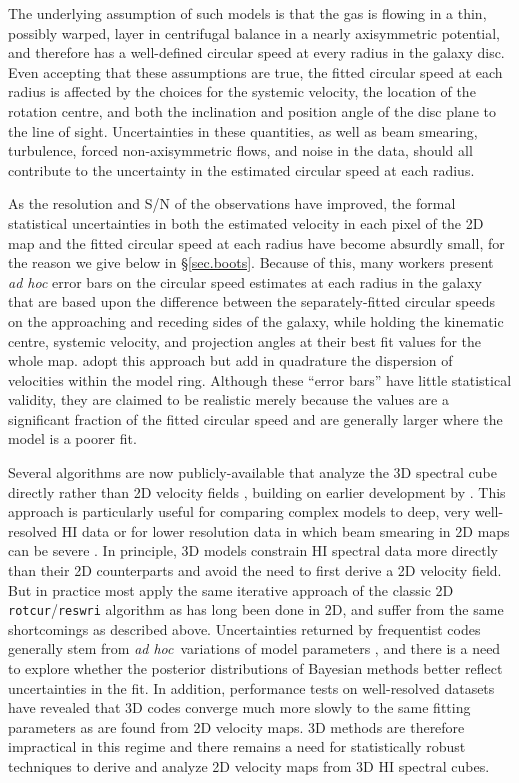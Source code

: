 \documentclass[letterpaper,fleqn,usenatbib]{mnras}
\def\adhoc{{\it ad hoc}}
\def\eg{{\it e.g.}}
\def\rtc{{\tt rotcur}}
\begin{document}
The underlying assumption of such models is that the gas is flowing in
a thin, possibly warped, layer in centrifugal balance in a nearly
axisymmetric potential, and therefore has a well-defined circular
speed at every radius in the galaxy disc.  Even accepting that these
assumptions are true, the fitted circular speed at each radius is
affected by the choices for the systemic velocity, the location of the
rotation centre, and both the inclination and position angle of the
disc plane to the line of sight.  Uncertainties in these quantities,
as well as beam smearing, turbulence, forced non-axisymmetric flows,
and noise in the data, should all contribute to the uncertainty in the
estimated circular speed at each radius.

As the resolution and S/N of the observations have improved, the
formal statistical uncertainties in both the estimated velocity in
each pixel of the 2D map and the fitted circular speed at each radius
have become absurdly small, for the reason we give below in
\S\ref{sec.boots}.  Because of this, many workers
\citep[\eg][]{Ch09} present {\it ad hoc} error bars on the circular
speed estimates at each radius in the galaxy that are based upon the
difference between the separately-fitted circular speeds on the
approaching and receding sides of the galaxy, while holding the
kinematic centre, systemic velocity, and projection angles at their
best fit values for the whole map. \citet{deB08} adopt this approach
but add in quadrature the dispersion of velocities within the model
ring.  Although these ``error bars'' have little statistical validity,
they are claimed to be realistic merely because the values are a
significant fraction of the fitted circular speed and are generally
larger where the model is a poorer fit.

Several algorithms are now publicly-available that analyze the 3D
spectral cube directly rather than 2D velocity fields \citep{Kamp15,
  DiT15, Davi13, Davi20}, building on earlier development by
\citet{Jozsa07}.  This approach is particularly useful for comparing
complex models to deep, very well-resolved HI data \citep{Jozsa09,
  Kamp13, Ma19} or for lower resolution data in which beam smearing in
2D maps can be severe \citep{DiT15, Kamp15}. In principle, 3D models
constrain HI spectral data more directly than their 2D counterparts
and avoid the need to first derive a 2D velocity field.  But in
practice most apply the same iterative approach of the classic 2D
\rtc/{\tt reswri} algorithm \citep{Si97, Sc97} as has long been done
in 2D, and suffer from the same shortcomings as described above.
Uncertainties returned by frequentist codes generally stem from
\adhoc\ variations of model parameters \citep[\eg][]{Kamp15, DiT15},
and there is a need to explore whether the posterior distributions of
Bayesian methods \citep[\eg][]{Bouche15, Davi17} better reflect
uncertainties in the fit.  In addition, performance tests on
well-resolved datasets have revealed that 3D codes converge much more
slowly to the same fitting parameters as are found from 2D velocity
maps.  3D methods are therefore impractical in this regime and there
remains a need for statistically robust techniques to derive and
analyze 2D velocity maps from 3D HI spectral cubes.
\end{document}
